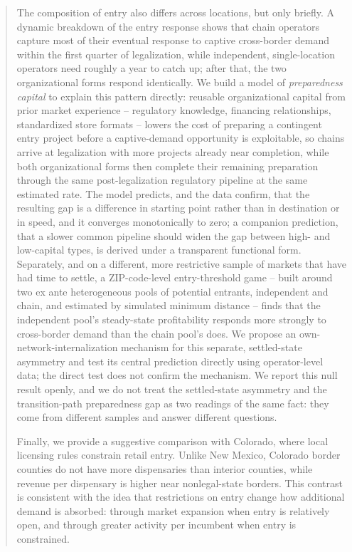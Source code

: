 \documentclass[english,12pt]{article}
\begin{document}
\begin{abstract}
The composition of entry also differs across locations, but only briefly. A dynamic breakdown of the entry response shows that chain operators capture most of their eventual response to captive cross-border demand within the first quarter of legalization, while independent, single-location operators need roughly a year to catch up; after that, the two organizational forms respond identically. We build a model of \emph{preparedness capital} to explain this pattern directly: reusable organizational capital from prior market experience -- regulatory knowledge, financing relationships, standardized store formats -- lowers the cost of preparing a contingent entry project before a captive-demand opportunity is exploitable, so chains arrive at legalization with more projects already near completion, while both organizational forms then complete their remaining preparation through the same post-legalization regulatory pipeline at the same estimated rate. The model predicts, and the data confirm, that the resulting gap is a difference in starting point rather than in destination or in speed, and it converges monotonically to zero; a companion prediction, that a slower common pipeline should widen the gap between high- and low-capital types, is derived under a transparent functional form. Separately, and on a different, more restrictive sample of markets that have had time to settle, a ZIP-code-level entry-threshold game -- built around two ex ante heterogeneous pools of potential entrants, independent and chain, and estimated by simulated minimum distance -- finds that the independent pool's steady-state profitability responds more strongly to cross-border demand than the chain pool's does. We propose an own-network-internalization mechanism for this separate, settled-state asymmetry and test its central prediction directly using operator-level data; the direct test does not confirm the mechanism. We report this null result openly, and we do not treat the settled-state asymmetry and the transition-path preparedness gap as two readings of the same fact: they come from different samples and answer different questions.

Finally, we provide a suggestive comparison with Colorado, where local licensing rules constrain retail entry. Unlike New Mexico, Colorado border counties do not have more dispensaries than interior counties, while revenue per dispensary is higher near nonlegal-state borders. This contrast is consistent with the idea that restrictions on entry change how additional demand is absorbed: through market expansion when entry is relatively open, and through greater activity per incumbent when entry is constrained.


\end{abstract}
\end{document}
